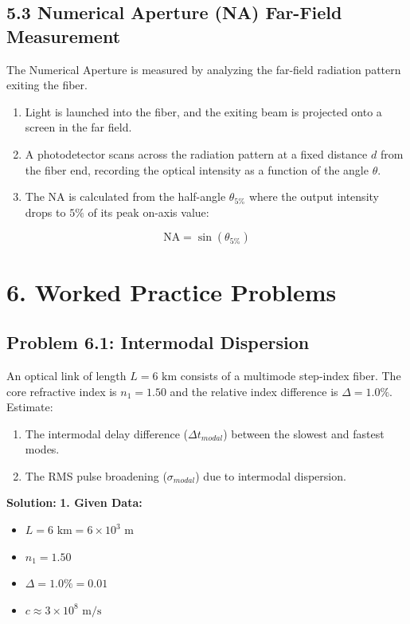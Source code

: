 \subsection{5.3 Numerical Aperture (NA) Far-Field Measurement}
The Numerical Aperture is measured by analyzing the far-field radiation pattern exiting the fiber.
\begin{enumerate}
  \item Light is launched into the fiber, and the exiting beam is projected onto a screen in the far field.
  \item A photodetector scans across the radiation pattern at a fixed distance $d$ from the fiber end, recording the optical intensity as a function of the angle $\theta$.
  \item The NA is calculated from the half-angle $\theta_{5\%}$ where the output intensity drops to $5\%$ of its peak on-axis value:
\end{enumerate}
    \[ \text{NA} = \sin(\theta_{5\%}) \]


\section{6. Worked Practice Problems}

\subsection{Problem 6.1: Intermodal Dispersion}
An optical link of length $L = 6\text{ km}$ consists of a multimode step-index fiber. The core refractive index is $n_1 = 1.50$ and the relative index difference is $\Delta = 1.0\%$. Estimate:
\begin{enumerate}
  \item The intermodal delay difference ($\Delta t_{modal}$) between the slowest and fastest modes.
  \item The RMS pulse broadening ($\sigma_{modal}$) due to intermodal dispersion.
\end{enumerate}

\textbf{Solution:}
\textbf{1. Given Data:}
\begin{itemize}
  \item   $L = 6\text{ km} = 6 \times 10^3\text{ m}$
  \item   $n_1 = 1.50$
  \item   $\Delta = 1.0\% = 0.01$
  \item   $c \approx 3 \times 10^8\text{ m/s}$
\end{itemize}

